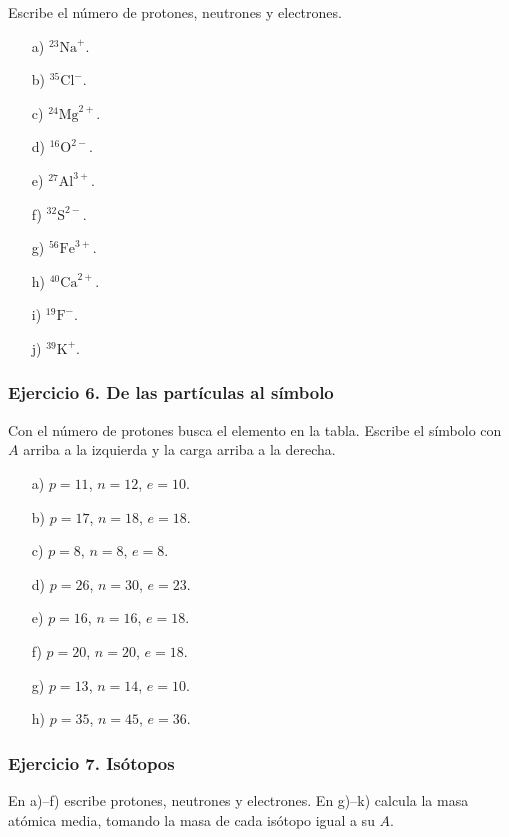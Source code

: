 Escribe el número de protones, neutrones y electrones.

\begin{enumerate}
    \item[a)] ${}^{23}\mathrm{Na}^{+}$.
    \item[b)] ${}^{35}\mathrm{Cl}^{-}$.
    \item[c)] ${}^{24}\mathrm{Mg}^{2+}$.
    \item[d)] ${}^{16}\mathrm{O}^{2-}$.
    \item[e)] ${}^{27}\mathrm{Al}^{3+}$.
    \item[f)] ${}^{32}\mathrm{S}^{2-}$.
    \item[g)] ${}^{56}\mathrm{Fe}^{3+}$.
    \item[h)] ${}^{40}\mathrm{Ca}^{2+}$.
    \item[i)] ${}^{19}\mathrm{F}^{-}$.
    \item[j)] ${}^{39}\mathrm{K}^{+}$.
\end{enumerate}

\subsubsection*{Ejercicio 6. De las partículas al símbolo}

Con el número de protones busca el elemento en la tabla.
Escribe el símbolo con $A$ arriba a la izquierda y la carga arriba a la derecha.

\begin{enumerate}
    \item[a)] $p=11$, $n=12$, $e=10$.
    \item[b)] $p=17$, $n=18$, $e=18$.
    \item[c)] $p=8$, $n=8$, $e=8$.
    \item[d)] $p=26$, $n=30$, $e=23$.
    \item[e)] $p=16$, $n=16$, $e=18$.
    \item[f)] $p=20$, $n=20$, $e=18$.
    \item[g)] $p=13$, $n=14$, $e=10$.
    \item[h)] $p=35$, $n=45$, $e=36$.
\end{enumerate}

\subsubsection*{Ejercicio 7. Isótopos}

En a)--f) escribe protones, neutrones y electrones.
En g)--k) calcula la masa atómica media,
tomando la masa de cada isótopo igual a su $A$.

